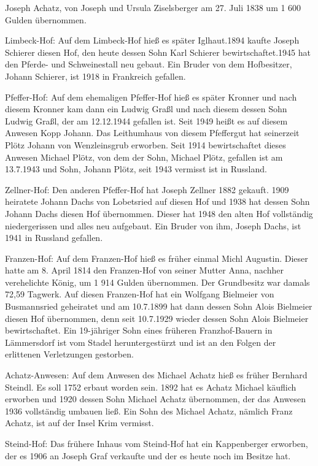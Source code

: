 \documentclass[12pt,a4pager]{book}
\begin{document}
Joseph Achatz, von Joseph und Ursula Ziselsberger am 27. Juli 1838 um 1 600
Gulden übernommen.

Limbeck-Hof: Auf dem Limbeck-Hof hieß es später Iglhaut.1894 kaufte Joseph
Schierer diesen Hof, den heute dessen Sohn Karl Schierer bewirtschaftet.1945 hat
den Pferde- und Schweinestall neu gebaut. Ein Bruder von dem Hofbesitzer, Johann
Schierer, ist 1918 in Frankreich gefallen.

Pfeffer-Hof: Auf dem ehemaligen Pfeffer-Hof hieß es später Kronner und nach
diesem Kronner kam dann ein Ludwig Graßl und nach diesem dessen Sohn Ludwig
Graßl, der am 12.12.1944 gefallen ist. Seit 1949 heißt es auf diesem Anwesen
Kopp Johann. Das Leithumhaus von diesem Pfeffergut hat seinerzeit Plötz Johann
von Wenzleinsgrub erworben. Seit 1914 bewirtschaftet dieses Anwesen Michael
Plötz, von dem der Sohn, Michael Plötz, gefallen ist am 13.7.1943 und Sohn,
Johann Plötz, seit 1943 vermisst ist in Russland.

Zellner-Hof: Den anderen Pfeffer-Hof hat Joseph Zellner 1882 gekauft. 1909
heiratete Johann Dachs von Lobetsried auf diesen Hof und 1938 hat dessen Sohn
Johann Dachs diesen Hof übernommen. Dieser hat 1948 den alten Hof vollständig
niedergerissen und alles neu aufgebaut. Ein Bruder von ihm, Joseph Dachs, ist
1941 in Russland gefallen.

Franzen-Hof: Auf dem Franzen-Hof hieß es früher einmal Michl Augustin. Dieser
hatte am 8. April 1814 den Franzen-Hof von seiner Mutter Anna, nachher
verehelichte König, um 1 914 Gulden übernommen. Der Grundbesitz war damals 72,59
Tagwerk. Auf diesen Franzen-Hof hat ein Wolfgang Bielmeier von Busmannsried
geheiratet und am 10.7.1899 hat dann dessen Sohn Alois Bielmeier diesen Hof
übernommen, denn seit 10.7.1929 wieder dessen Sohn Alois Bielmeier
bewirtschaftet. Ein 19-jähriger Sohn eines früheren Franzhof-Bauern in
Lämmersdorf ist vom Stadel heruntergestürzt und ist an den Folgen der erlittenen
Verletzungen gestorben.

Achatz-Anwesen: Auf dem Anwesen des Michael Achatz hieß es früher Bernhard
Steindl. Es soll 1752 erbaut worden sein. 1892 hat es Achatz Michael käuflich
erworben und 1920 dessen Sohn Michael Achatz übernommen, der das Anwesen 1936
vollständig umbauen ließ. Ein Sohn des Michael Achatz, nämlich Franz Achatz, ist
auf der Insel Krim vermisst.

Steind-Hof: Das frühere Inhaus vom Steind-Hof hat ein Kappenberger erworben, der
es 1906 an Joseph Graf verkaufte und der es heute noch im Besitze hat.
\end{document}
